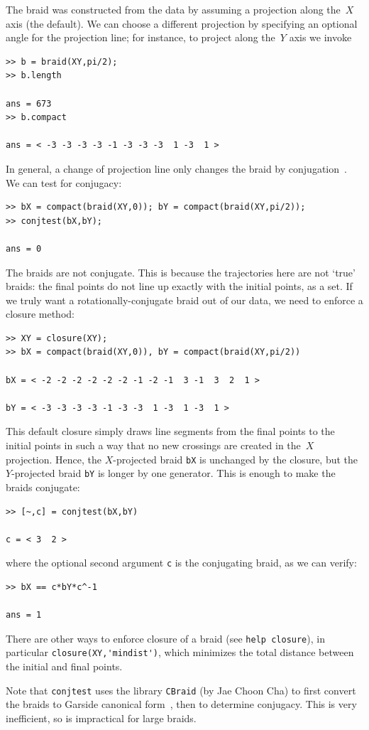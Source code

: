 \documentclass[12pt]{article}
\begin{document}
The braid was constructed from the data by assuming a projection along
the~$X$ axis (the default).  We can choose a different projection by
specifying an optional angle for the projection line; for instance, to
project along the~$Y$ axis we invoke
\begin{lstlisting}[frame=single,framerule=0pt]
>> b = braid(XY,pi/2);
>> b.length

ans = 673
>> b.compact

ans = < -3 -3 -3 -3 -1 -3 -3 -3  1 -3  1 >
\end{lstlisting}
In general, a change of projection line only changes the braid by
conjugation~\cite[p.~271]{Boyland1994,Thiffeault2010}.  We can test
for conjugacy:
\begin{lstlisting}[frame=single,framerule=0pt]
>> bX = compact(braid(XY,0)); bY = compact(braid(XY,pi/2));
>> conjtest(bX,bY);

ans = 0
\end{lstlisting}
The braids are not conjugate.  This is because the trajectories here
are not `true' braids: the final points do not line up exactly with
the initial points, as a set.  If we truly want a
rotationally-conjugate braid out of our data, we need to enforce a
closure method:
\begin{lstlisting}[frame=single,framerule=0pt]
>> XY = closure(XY);
>> bX = compact(braid(XY,0)), bY = compact(braid(XY,pi/2))

bX = < -2 -2 -2 -2 -2 -2 -1 -2 -1  3 -1  3  2  1 >

bY = < -3 -3 -3 -3 -1 -3 -3  1 -3  1 -3  1 >
\end{lstlisting}
This default closure simply draws line segments from the final points
to the initial points in such a way that no new crossings are created
in the~$X$ projection.  Hence, the $X$-projected braid \lstinline{bX}
is unchanged by the closure, but the $Y$-projected braid
\lstinline{bY} is longer by one generator.  This is enough to make the
braids conjugate:
\begin{lstlisting}[frame=single,framerule=0pt]
>> [~,c] = conjtest(bX,bY)

c = < 3  2 >
\end{lstlisting}
where the optional second argument \lstinline{c} is the conjugating
braid, as we can verify:
\begin{lstlisting}[frame=single,framerule=0pt]
>> bX == c*bY*c^-1

ans = 1
\end{lstlisting}
There are other ways to enforce closure of a braid (see
\lstinline{help closure}), in particular
\lstinline{closure(XY,'mindist')}, which minimizes the total distance
between the initial and final points.

Note that \lstinline{conjtest} uses the library \texttt{CBraid} (by
Jae Choon Cha) to first convert the braids to Garside canonical
form~\citep{Birman2005}, then to determine conjugacy.  This is very
inefficient, so is impractical for large braids.


% 



\end{document}
